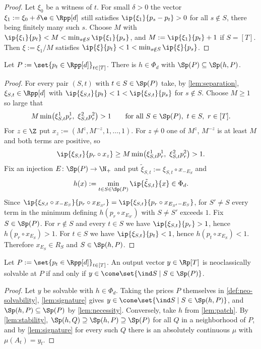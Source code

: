 \begin{proof}
Let $\xi_0$ be a witness of $t$. For small $\delta>0$ the vector $\xi_1:=\xi_0+\delta\e\in\Rpp[d]$ still satisfies $\ip{\xi_1}{p_s-p_t}>0$ for all $s\notin S$, there being finitely many such $s$. Choose $M$ with $\ip{\xi_1}{p_t}<M<\min_{s\notin S}\ip{\xi_1}{p_s}$, and $M:=\ip{\xi_1}{p_t}+1$ if $S=[T]$. Then $\xi:=\xi_1/M$ satisfies $\ip{\xi}{p_t}<1<\min_{s\notin S}\ip{\xi}{p_s}$.
\end{proof}

\begin{lemma}[patching]\label{lem:patch}
Let $P:=\set{p_t\in\Rpp[d]}_{t\in[T]}$. There is $h\in\Phi_d$ with $\Sp(P)\subseteq\Sp(h,P)$.
\end{lemma}

\begin{proof}
For every pair $(S,t)$ with $t\in S\in\Sp(P)$ take, by \cref{lem:separation}, $\xi_{S,t}\in\Rpp[d]$ with $\ip{\xi_{S,t}}{p_t}<1<\ip{\xi_{S,t}}{p_s}$ for $s\notin S$. Choose $M\ge1$ so large that
\[
M\min\bigl(\xi^1_{S,t}p^1_r,\ \xi^2_{S,t}p^2_r\bigr)>1\qquad\text{for all }S\in\Sp(P),\ t\in S,\ r\in[T].
\]
For $z\in\Z$ put $x_z:=(M^z,M^{-z},1,\dots,1)$. For $z\ne0$ one of $M^z$, $M^{-z}$ is at least $M$ and both terms are positive, so
\[
\ip{\xi_{S,t}}{p_r\circ x_z}\ge M\min\bigl(\xi^1_{S,t}p^1_r,\ \xi^2_{S,t}p^2_r\bigr)>1 .
\]
Fix an injection $E\colon\Sp(P)\to\N_+$ and put $\tilde\xi_{S,t}:=\xi_{S,t}\circ x_{-E_S}$ and
\[
h(x):=\min_{t\in S\in\Sp(P)}\ip{\tilde\xi_{S,t}}{x}\in\Phi_d .
\]
Since $\ip{\xi_{S,t}\circ x_{-E_S}}{p_r\circ x_{E_{S'}}}=\ip{\xi_{S,t}}{p_r\circ x_{E_{S'}-E_S}}$, for $S'\ne S$ every term in the minimum defining $h(p_r\circ x_{E_{S'}})$ with $S\ne S'$ exceeds $1$. Fix $S\in\Sp(P)$. For $r\notin S$ and every $t\in S$ we have $\ip{\xi_{S,t}}{p_r}>1$, hence $h(p_r\circ x_{E_S})>1$. For $t\in S$ we have $\ip{\xi_{S,t}}{p_t}<1$, hence $h(p_t\circ x_{E_S})<1$. Therefore $x_{E_S}\in R_S$ and $S\in\Sp(h,P)$.
\end{proof}

\begin{theorem}\label{thm:solvability}
Let $P:=\set{p_t\in\Rpp[d]}_{t\in[T]}$. An output vector $y\in\Rp[T]$ is neoclassically solvable at $P$ if and only if $y\in\cone\set{\ind S\mid S\in\Sp(P)}$.
\end{theorem}

\begin{proof}
Let $y$ be solvable with $h\in\Phi_d$. Taking the prices $P$ themselves in \cref{def:neo-solvability}, \cref{lem:signature} gives $y\in\cone\set{\ind S\mid S\in\Sp(h,P)}$, and $\Sp(h,P)\subseteq\Sp(P)$ by \cref{lem:necessity}. Conversely, take $h$ from \cref{lem:patch}. By \cref{lem:stability}, $\Sp(h,Q)\supseteq\Sp(h,P)\supseteq\Sp(P)$ for all $Q$ in a neighborhood of $P$, and by \cref{lem:signature} for every such $Q$ there is an absolutely continuous $\mu$ with $\mu(A_t)=y_t$.
\end{proof}

